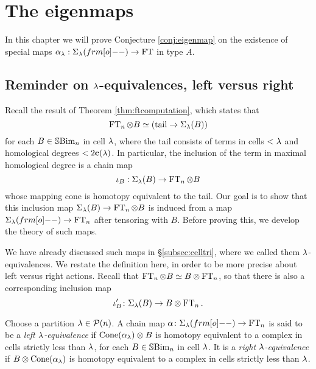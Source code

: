 \section{The eigenmaps}
\label{sec:constructing}


In this chapter we will prove Conjecture \ref{conj:eigenmap} on the existence of special maps $\a_\l:\Sigma_\l(\one)\rightarrow \FT$  in type $A$. %


\subsection{Reminder on $\lambda$-equivalences, left versus right}
\label{subsec:lambdaEquiv}

Recall the result of Theorem \ref{thm:ftcomputation}, which states that
\begin{equation}\label{eq:FTwithtail}
\operatorname{FT}_n\otimes B \simeq (\text{tail}\rightarrow \Sigma_{\lambda}(B))
\end{equation}
for each $B\in {\mathbb{S}}{\rm Bim }_n$ in cell $\lambda$, where the tail consists of terms in cells $<\lambda$ and homological degrees $<2\mathbf{c}(\lambda)$.  In particular, the inclusion of the term in maximal homological degree is a chain map \[ \iota_B:\Sigma_{\lambda}(B) \rightarrow \operatorname{FT}_n\otimes B\] whose mapping cone is homotopy equivalent to the  tail. Our goal is to show that this inclusion map $\Sigma_{\lambda}(B)\rightarrow \operatorname{FT}_n\otimes B$ is induced from a map $\shift{\l}{\one}\to \FT_n$ after tensoring with $B$. Before proving this, we develop the theory of such maps.

We have already discussed such maps in \S\ref{subsec:celltri}, where we called them $\lambda$-equivalences. We restate the definition here, in order to be more precise about left versus right actions.  Recall that $\operatorname{FT}_n \otimes B \simeq B \otimes \operatorname{FT}_n$, so that there is also a corresponding inclusion map \[\iota'_B \colon \Sigma_{\lambda}(B) \rightarrow B \otimes \operatorname{FT}_n.\]

\begin{definition}\label{def:lambdaMap} Choose a partition $\lambda \in {\mathcal{P}}(n)$. A chain map $\a \co \shift{\l}{\one} \to \FT_n$ is said to be a \emph{left $\lambda$-equivalence} if $\operatorname{Cone}(\alpha_\lambda)
\otimes B$ is homotopy equivalent to a complex in cells strictly less than $\lambda$, for each $B\in {\mathbb{S}}{\rm Bim }_n$ in cell $\lambda$. It is a \emph{right $\lambda$-equivalence} if $B \otimes \operatorname{Cone}(\alpha_\lambda)$  is homotopy equivalent to a complex in cells strictly less than $\lambda$. \end{definition}

